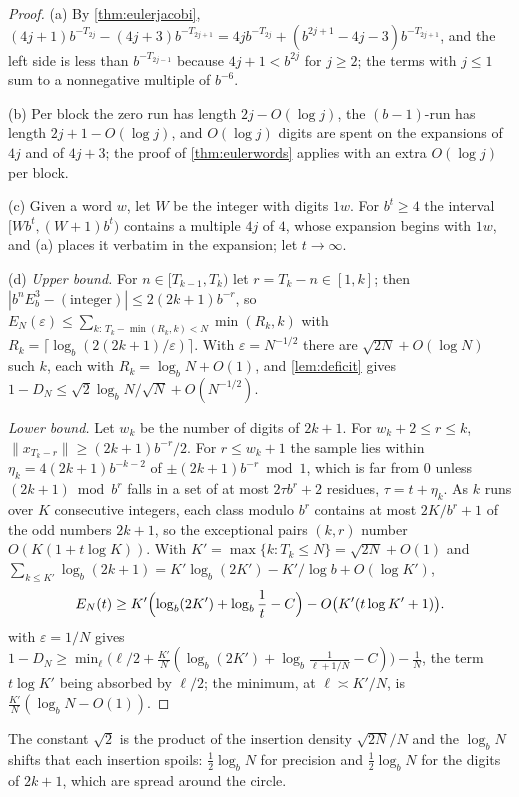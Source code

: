 \documentclass[11pt]{article}
\newcommand{\dist}[1]{\lVert #1\rVert}
\begin{document}
\begin{proof}
(a) By \cref{thm:eulerjacobi},
$(4j+1)b^{-T_{2j}}-(4j+3)b^{-T_{2j+1}}=4jb^{-T_{2j}}+(b^{2j+1}-4j-3)b^{-T_{2j+1}}$, and the
left side is less than $b^{-T_{2j-1}}$ because $4j+1<b^{2j}$ for $j\ge2$; the terms with
$j\le1$ sum to a nonnegative multiple of $b^{-6}$.

(b) Per block the zero run has length $2j-O(\log j)$, the $(b-1)$-run has length
$2j+1-O(\log j)$, and $O(\log j)$ digits are spent on the expansions of $4j$ and of
$4j+3$; the proof of \cref{thm:eulerwords} applies with an extra $O(\log j)$ per block.

(c) Given a word $w$, let $W$ be the integer with digits $1w$. For $b^t\ge4$ the interval
$[Wb^t,(W+1)b^t)$ contains a multiple $4j$ of $4$, whose expansion begins with $1w$, and (a)
places it verbatim in the expansion; let $t\to\infty$.

(d) \emph{Upper bound.} For $n\in[T_{k-1},T_k)$ let $r=T_k-n\in[1,k]$; then
$|b^nE_b^3-(\text{integer})|\le2(2k+1)b^{-r}$, so
$E_N(\varepsilon)\le\sum_{k:\,T_k-\min(R_k,k)<N}\min(R_k,k)$ with
$R_k=\lceil\log_b(2(2k+1)/\varepsilon)\rceil$. With $\varepsilon=N^{-1/2}$ there are
$\sqrt{2N}+O(\log N)$ such $k$, each with $R_k=\log_bN+O(1)$, and \cref{lem:deficit} gives
$1-D_N\le\sqrt2\log_bN/\sqrt N+O(N^{-1/2})$.

\emph{Lower bound.} Let $w_k$ be the number of digits of $2k+1$. For $w_k+2\le r\le k$,
$\dist{x_{T_k-r}}\ge(2k+1)b^{-r}/2$. For $r\le w_k+1$ the sample lies within
$\eta_k=4(2k+1)b^{-k-2}$ of $\pm(2k+1)b^{-r}\bmod1$, which is far from $0$ unless
$(2k+1)\bmod b^r$ falls in a set of at most $2\tau b^r+2$ residues, $\tau=t+\eta_k$. As $k$
runs over $K$ consecutive integers, each class modulo $b^r$ contains at most $2K/b^r+1$ of the
odd numbers $2k+1$, so the exceptional pairs $(k,r)$ number $O(K(1+t\log K))$. With
$K'=\max\{k:T_k\le N\}=\sqrt{2N}+O(1)$ and
$\sum_{k\le K'}\log_b(2k+1)=K'\log_b(2K')-K'/\log b+O(\log K')$,
\[
E_N(t)\ge K'\Bigl(\log_b(2K')+\log_b\frac1t-C\Bigr)-O\bigl(K'(t\log K'+1)\bigr).
\]
 with $\varepsilon=1/N$ gives
$1-D_N\ge\min_\ell\bigl(\ell/2+\frac{K'}N(\log_b(2K')+\log_b\frac1{\ell+1/N}-C)\bigr)-\frac1N$,
the term $t\log K'$ being absorbed by $\ell/2$; the minimum, at $\ell\asymp K'/N$, is
$\frac{K'}N(\log_bN-O(1))$.
\end{proof}

The constant $\sqrt2$ is the product of the insertion density $\sqrt{2N}/N$ and the
$\log_bN$ shifts that each insertion spoils: $\frac12\log_bN$ for precision and
$\frac12\log_bN$ for the digits of $2k+1$, which are spread around the circle.
\end{document}
